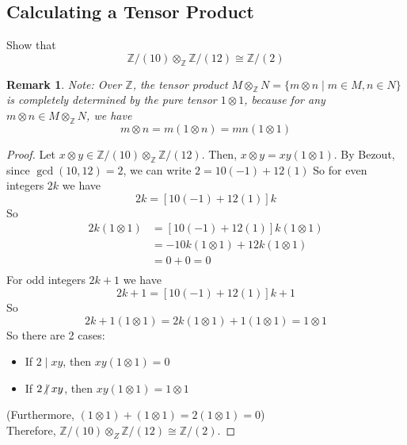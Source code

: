 \documentclass[hidelinks,12pt]{article}
\newtheorem*{remark}{Remark}
\newcommand{\Z}{\mathbb{Z}}
\begin{document}
\subsection{Calculating a Tensor Product} Show that \[
\Z/(10)\otimes_{\Z}\Z/(12)\cong\Z/(2)
\]
\begin{remark}
    Note: Over \(\Z\), the tensor product \(M\otimes_{\Z}N=\{m\otimes n\mid m\in M,n\in N\}\) is completely determined by the pure tensor \(1\otimes 1\), because for any \(m\otimes n\in M\otimes_{\Z}N\), we have \[
        m\otimes n=m(1\otimes n)=mn(1\otimes 1)
    \]
\end{remark}
\begin{proof}
    Let \(x\otimes y\in\Z/(10)\otimes_{\Z}\Z/(12)\). Then, \(x\otimes y=xy(1\otimes 1)\). By Bezout, since \(\gcd( 10,12 )=2\), we can write \(2=10(-1)+12(1)\) So for even integers \(2k\) we have\[
        2k=\left[10(-1)+12(1)\right]k
    \]
    So \begin{align*}
        2k(1\otimes 1)&=\left[10(-1)+12(1)\right]k(1\otimes 1)\\
        &=-10k(1\otimes 1)+12k(1\otimes 1)\\
        &=0+0=0\\
    \end{align*}
    For odd integers \(2k+1\) we have 
    \[
        2k+1=\left[10(-1)+12(1)\right]k+1
    \]
    So \[ 
        2k+1(1\otimes 1)=2k(1\otimes 1)+1(1\otimes 1)=1\otimes 1
    \]
    So there are 2 cases:
   \begin{itemize}
       \item If \(2\mid xy\), then \(xy(1\otimes 1)=0\)
       \item If \(2\centernot\mid xy\), then \(xy(1\otimes 1)=1\otimes 1\)
   \end{itemize} 
   (Furthermore, \((1\otimes 1)+(1\otimes 1)=2(1\otimes1)=0\))\\
   Therefore, \(\Z/(10)\otimes_{Z}\Z/(12)\cong\Z/(2)\).
\end{proof}
\end{document}
